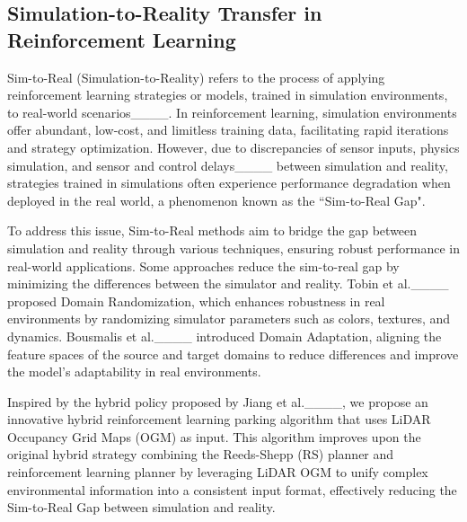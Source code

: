 \subsection{Simulation-to-Reality Transfer in Reinforcement Learning}

Sim-to-Real (Simulation-to-Reality) refers to the process of applying reinforcement learning strategies or models, trained in simulation environments, to real-world scenarios____. 
In reinforcement learning, simulation environments offer abundant, low-cost, and limitless training data, facilitating rapid iterations and strategy optimization. 
However, due to discrepancies of sensor inputs, physics simulation, and sensor and control delays____ between simulation and reality, strategies trained in simulations often experience performance degradation when deployed in the real world, a phenomenon known as the “Sim-to-Real Gap".

To address this issue, Sim-to-Real methods aim to bridge the gap between simulation and reality through various techniques, ensuring robust performance in real-world applications. 
Some approaches reduce the sim-to-real gap by minimizing the differences between the simulator and reality. 
Tobin et al.____ proposed Domain Randomization, which enhances robustness in real environments by randomizing simulator parameters such as colors, textures, and dynamics. 
Bousmalis et al.____ introduced Domain Adaptation, aligning the feature spaces of the source and target domains to reduce differences and improve the model's adaptability in real environments.


Inspired by the hybrid policy proposed by Jiang et al.____, we propose an innovative hybrid reinforcement learning parking algorithm that uses LiDAR Occupancy Grid Maps (OGM) as input. This algorithm improves upon the original hybrid strategy combining the Reeds-Shepp (RS) planner and reinforcement learning planner by leveraging LiDAR OGM to unify complex environmental information into a consistent input format, effectively reducing the Sim-to-Real Gap between simulation and reality.



